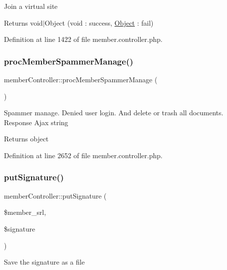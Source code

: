Join a virtual site

\begin{DoxyReturn}{Returns}
void$\vert$\+Object (void \+: success, \hyperlink{classObject}{Object} \+: fail) 
\end{DoxyReturn}


Definition at line 1422 of file member.\+controller.\+php.

\mbox{\label{classmemberController_a99f87aecac7ae283cec747a007df88b8}} 
\subsubsection{\texorpdfstring{proc\+Member\+Spammer\+Manage()}{procMemberSpammerManage()}}
{\footnotesize\ttfamily member\+Controller\+::proc\+Member\+Spammer\+Manage (\begin{DoxyParamCaption}{ }\end{DoxyParamCaption})}

Spammer manage. Denied user login. And delete or trash all documents. Response Ajax string

\begin{DoxyReturn}{Returns}
object 
\end{DoxyReturn}


Definition at line 2652 of file member.\+controller.\+php.

\mbox{\label{classmemberController_a084c3af4daea1a860f95e06f2bc5fc28}} 
\subsubsection{\texorpdfstring{put\+Signature()}{putSignature()}}
{\footnotesize\ttfamily member\+Controller\+::put\+Signature (\begin{DoxyParamCaption}\item[{}]{\$member\+\_\+srl,  }\item[{}]{\$signature }\end{DoxyParamCaption})}

Save the signature as a file


